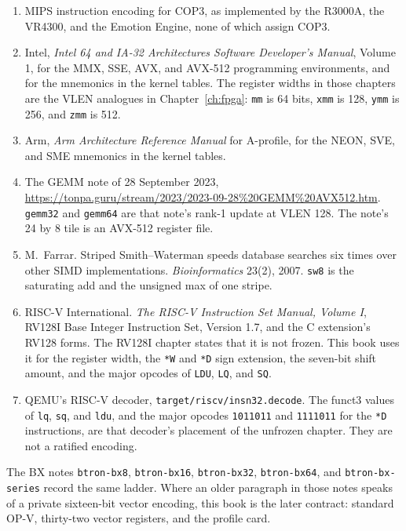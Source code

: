 \begin{enumerate}[leftmargin=1.5em]
  \item MIPS instruction encoding for COP3, as implemented by the R3000A, the VR4300, and the Emotion Engine, none of which assign COP3.
  \item Intel, \emph{Intel 64 and IA-32 Architectures Software Developer's Manual}, Volume 1, for the MMX, SSE, AVX, and AVX-512 programming environments, and for the mnemonics in the kernel tables. The register widths in those chapters are the VLEN analogues in Chapter~\ref{ch:fpga}: \texttt{mm} is 64 bits, \texttt{xmm} is 128, \texttt{ymm} is 256, and \texttt{zmm} is 512.
  \item Arm, \emph{Arm Architecture Reference Manual} for A-profile, for the NEON, SVE, and SME mnemonics in the kernel tables.
  \item The GEMM note of 28 September 2023, \url{https://tonpa.guru/stream/2023/2023-09-28\%20GEMM\%20AVX512.htm}. \texttt{gemm32} and \texttt{gemm64} are that note's rank-1 update at VLEN 128. The note's 24 by 8 tile is an AVX-512 register file.
  \item M.~Farrar. Striped Smith--Waterman speeds database searches six times over other SIMD implementations. \emph{Bioinformatics} 23(2), 2007. \texttt{sw8} is the saturating add and the unsigned max of one stripe.
  \item RISC-V International. \emph{The RISC-V Instruction Set Manual, Volume I}, RV128I Base Integer Instruction Set, Version 1.7, and the C extension's RV128 forms. The RV128I chapter states that it is not frozen. This book uses it for the register width, the \texttt{*W} and \texttt{*D} sign extension, the seven-bit shift amount, and the major opcodes of \texttt{LDU}, \texttt{LQ}, and \texttt{SQ}.
  \item QEMU's RISC-V decoder, \texttt{target/riscv/insn32.decode}. The funct3 values of \texttt{lq}, \texttt{sq}, and \texttt{ldu}, and the major opcodes \texttt{1011011} and \texttt{1111011} for the \texttt{*D} instructions, are that decoder's placement of the unfrozen chapter. They are not a ratified encoding.
\end{enumerate}

\noindent The BX notes \texttt{btron-bx8}, \texttt{btron-bx16}, \texttt{btron-bx32}, \texttt{btron-bx64}, and \texttt{btron-bx-series} record the same ladder. Where an older paragraph in those notes speaks of a private sixteen-bit vector encoding, this book is the later contract: standard OP-V, thirty-two vector registers, and the profile card.
